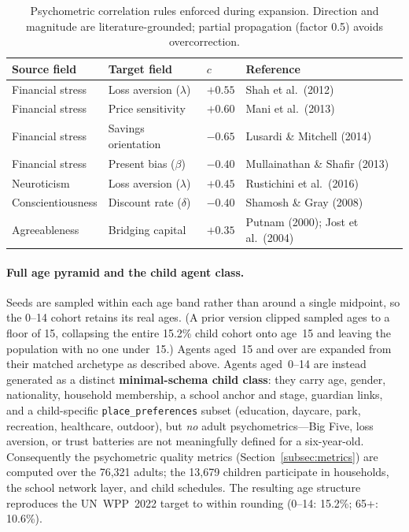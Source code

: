 \documentclass[a4paper,12pt]{article}
\begin{document}
\begin{table}[H]
\caption{Psychometric correlation rules enforced during expansion.
Direction and magnitude are literature-grounded; partial propagation
(factor 0.5) avoids overcorrection.}
\label{tab:correlations}
\begin{tabularx}{\textwidth}{p{4.0cm}p{4.0cm}Xp{3.0cm}}
\toprule
\textbf{Source field} & \textbf{Target field} & \textbf{$c$} & \textbf{Reference} \\
\midrule
Financial stress      & Loss aversion ($\lambda$)   & $+0.55$ & Shah et al.\ (2012) \\
Financial stress      & Price sensitivity            & $+0.60$ & Mani et al.\ (2013) \\
Financial stress      & Savings orientation          & $-0.65$ & Lusardi \& Mitchell (2014) \\
Financial stress      & Present bias ($\beta$)       & $-0.40$ & Mullainathan \& Shafir (2013) \\
Neuroticism           & Loss aversion ($\lambda$)   & $+0.45$ & Rustichini et al.\ (2016) \\
Conscientiousness     & Discount rate ($\delta$)    & $-0.40$ & Shamosh \& Gray (2008) \\
Agreeableness         & Bridging capital             & $+0.35$ & Putnam (2000); Jost et al.\ (2004) \\
\bottomrule
\end{tabularx}
\end{table}

\paragraph{Full age pyramid and the child agent class.}
Seeds are sampled within each age band rather than around a single midpoint, so
the 0--14 cohort retains its real ages. (A prior version clipped sampled ages to a
floor of 15, collapsing the entire 15.2\% child cohort onto age~15 and leaving the
population with no one under~15.) Agents aged~15 and over are expanded from their
matched archetype as described above. Agents aged~0--14 are instead generated as a
distinct \textbf{minimal-schema child class}: they carry age, gender, nationality,
household membership, a school anchor and stage, guardian links, and a child-specific
\texttt{place\_preferences} subset (education, daycare, park, recreation, healthcare,
outdoor), but \emph{no} adult psychometrics---Big Five, loss aversion, or trust
batteries are not meaningfully defined for a six-year-old. Consequently the
psychometric quality metrics (Section~\ref{subsec:metrics}) are computed over the
76{,}321 adults; the 13{,}679 children participate in households, the school network
layer, and child schedules. The resulting age structure reproduces the UN~WPP~2022
target to within rounding (0--14: 15.2\%; 65+: 10.6\%).
\end{document}
